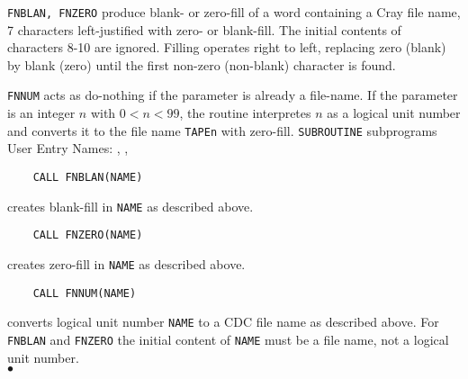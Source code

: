                             
                           
\Submitter{}                                
                     
{\tt FNBLAN, FNZERO} produce blank- or zero-fill of
a word containing a Cray file name, 7 characters left-justified
with zero- or blank-fill. The initial contents of characters
8-10 are ignored. Filling operates right to left, replacing
zero (blank) by blank (zero) until the first non-zero
(non-blank) character is found.
\par
{\tt FNNUM} acts as do-nothing if the parameter
is already a file-name. If the parameter is an integer $n$ with
$0 < n < 99$, the routine interpretes $n$ as a logical unit number
and converts it to the file name {\tt TAPEn} with zero-fill.
\Structure
{\tt SUBROUTINE} subprograms \\
User Entry Names: , , 
\Usage
\begin{verbatim}
    CALL FNBLAN(NAME)
\end{verbatim}
creates blank-fill in {\tt NAME} as described above.
\begin{verbatim}
    CALL FNZERO(NAME)
\end{verbatim}
creates zero-fill in {\tt NAME} as described above.
\begin{verbatim}
    CALL FNNUM(NAME)
\end{verbatim}
converts logical unit number {\tt NAME} to a CDC file name as described
above.
\Notes
For {\tt FNBLAN} and {\tt FNZERO} the initial content of {\tt NAME}
must be a
file name, not a logical unit number.
\\ $\bullet$
